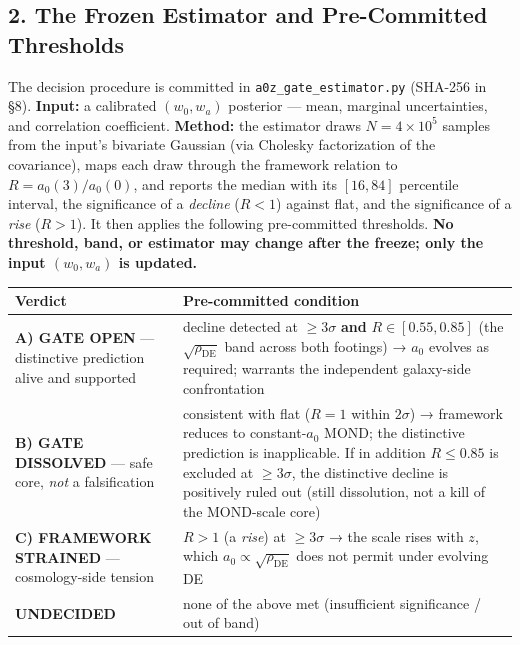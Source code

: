\documentclass[
]{article}
\newcounter{none} %
\begin{document}
\subsection{2. The Frozen Estimator and Pre-Committed
Thresholds}\label{the-frozen-estimator-and-pre-committed-thresholds}

The decision procedure is committed in \texttt{a0z\_gate\_estimator.py}
(SHA-256 in §8). \textbf{Input:} a calibrated \((w_0,w_a)\) posterior
--- mean, marginal uncertainties, and correlation coefficient.
\textbf{Method:} the estimator draws \(N=4\times10^5\) samples from the
input's bivariate Gaussian (via Cholesky factorization of the
covariance), maps each draw through the framework relation to
\(R=a_0(3)/a_0(0)\), and reports the median with its \([16,84]\)
percentile interval, the significance of a \emph{decline} (\(R<1\))
against flat, and the significance of a \emph{rise} (\(R>1\)). It then
applies the following pre-committed thresholds. \textbf{No threshold,
band, or estimator may change after the freeze; only the input
\((w_0,w_a)\) is updated.}

{\def\LTcaptype{none} %
\begin{longtable}[]{@{}
  >{\raggedright\arraybackslash}p{}
  >{\raggedright\arraybackslash}p{}@{}}
\toprule\noalign{}
\begin{minipage}[b]{\linewidth}\raggedright
Verdict
\end{minipage} & \begin{minipage}[b]{\linewidth}\raggedright
Pre-committed condition
\end{minipage} \\
\midrule\noalign{}
\endhead
\bottomrule\noalign{}
\endlastfoot
\textbf{A) GATE OPEN} --- distinctive prediction alive and supported &
decline detected at \(\ge 3\sigma\) \textbf{and} \(R\in[0.55,0.85]\)
(the \(\sqrt{\rho_\mathrm{DE}}\) band across both footings) → \(a_0\)
evolves as required; warrants the independent galaxy-side
confrontation \\
\textbf{B) GATE DISSOLVED} --- safe core, \emph{not} a falsification &
consistent with flat (\(R=1\) within \(2\sigma\)) → framework reduces to
constant-\(a_0\) MOND; the distinctive prediction is inapplicable. If in
addition \(R\le0.85\) is excluded at \(\ge3\sigma\), the distinctive
decline is positively ruled out (still dissolution, not a kill of the
MOND-scale core) \\
\textbf{C) FRAMEWORK STRAINED} --- cosmology-side tension & \(R>1\) (a
\emph{rise}) at \(\ge3\sigma\) → the scale rises with \(z\), which
\(a_0\propto\sqrt{\rho_\mathrm{DE}}\) does not permit under evolving DE \\
\textbf{UNDECIDED} & none of the above met (insufficient significance /
out of band) \\
\end{longtable}
}
\end{document}

